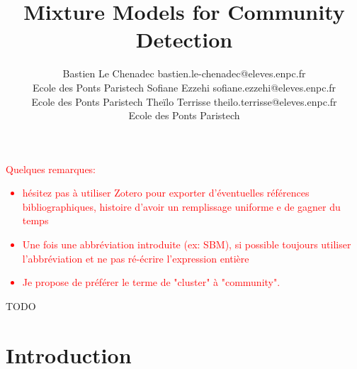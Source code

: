 \documentclass[10pt]{article}
\begin{document}
\title{Mixture Models for Community Detection}

\author{\name Bastien Le Chenadec \email bastien.le-chenadec@eleves.enpc.fr \\
    \addr Ecole des Ponts Paristech
    \AND
    \name Sofiane Ezzehi \email sofiane.ezzehi@eleves.enpc.fr \\
    \addr Ecole des Ponts Paristech
    \AND
    \name Theïlo Terrisse \email theilo.terrisse@eleves.enpc.fr \\
    \addr Ecole des Ponts Paristech
}

\maketitle

\textcolor{red}{Quelques remarques:
    \begin{itemize}
        \item hésitez pas à utiliser Zotero pour exporter d'éventuelles références bibliographiques, histoire d'avoir un remplissage uniforme e de gagner du temps
        \item Une fois une abbréviation introduite (ex: SBM), si possible toujours utiliser l'abbréviation et ne pas ré-écrire l'expression entière
        \item Je propose de préférer le terme de "cluster" à "community".
    \end{itemize}
}

\begin{contribstatement}
    TODO
\end{contribstatement}


\section{Introduction}
\end{document}
